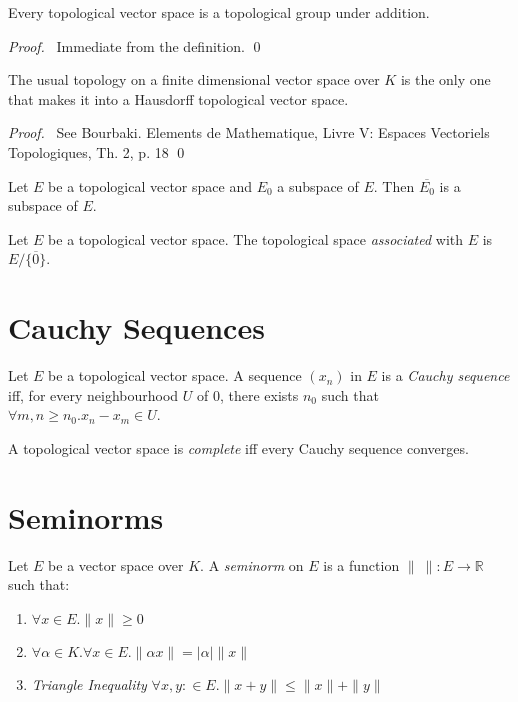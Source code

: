 \begin{prop}
Every topological vector space is a topological group under addition.
\end{prop}

\begin{proof}
\pf\ Immediate from the definition. \qed
\end{proof}

\begin{thm}
The usual topology on a finite dimensional vector space over $K$ is the only one that makes it into a Hausdorff topological vector space.
\end{thm}

\begin{proof}
\pf\ See Bourbaki. Elements de Mathematique, Livre V: Espaces Vectoriels Topologiques, Th. 2, p. 18 \qed
\end{proof}

\begin{prop}
Let $E$ be a topological vector space and $E_0$ a subspace of $E$. Then $\overline{E_0}$ is a subspace of $E$.
\end{prop}

\begin{df}
Let $E$ be a topological vector space. The topological space \emph{associated} with $E$ is $E / \overline{\{0\}}$.
\end{df}

\section{Cauchy Sequences}

\begin{df}
Let $E$ be a topological vector space. A sequence $(x_n)$ in $E$ is a \emph{Cauchy sequence} iff, for every neighbourhood $U$ of 0, there exists $n_0$ such that $\forall m,n \geq n_0. x_n - x_m \in U$.
\end{df}

\begin{df}
A topological vector space is \emph{complete} iff every Cauchy sequence converges.
\end{df}

\section{Seminorms}

\begin{df}[Seminorm]
Let $E$ be a vector space over $K$. A \emph{seminorm} on $E$ is a function $\|\ \| : E \rightarrow \mathbb{R}$ such that:
\begin{enumerate}
\item $\forall x \in E. \| x \| \geq 0$
\item $\forall \alpha \in K. \forall x \in E. \| \alpha x \| = |\alpha| \|x\|$
\item \emph{Triangle Inequality} $\forall x,y : \in E. \| x + y \| \leq \| x \| + \| y \|$
\end{enumerate}
\end{df}

